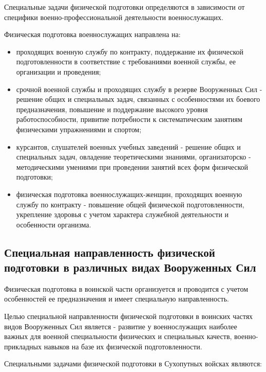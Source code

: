 \documentclass[a4paper]{article}
\begin{document}
    Специальные задачи физической подготовки определяются в зависимости от специфики военно-профессиональной деятельности военнослужащих.

    Физическая подготовка военнослужащих направлена на:

    \begin{itemize}
        \item проходящих военную службу по контракту, поддержание их физической подготовленности в соответствие с требованиями военной службы, ее организации и проведения;
        \item срочной военной службы и проходящих службу в резерве Вооруженных Сил - решение общих и специальных задач, связанных с особенностями их боевого предназначения, повышение и поддержание высокого уровня работоспособности, привитие потребности к систематическим занятиям физическими упражнениями и спортом;
        \item курсантов, слушателей военных учебных заведений - решение общих и специальных задач, овладение теоретическими знаниями, организаторско - методическими умениями при проведении занятий всех форм физической подготовки;
        \item физическая подготовка военнослужащих-женщин, проходящих военную службу по контракту - повышение общей физической подготовленности, укрепление здоровья с учетом характера служебной деятельности и особенности организма.
    \end{itemize}

    \subsection{Специальная направленность физической подготовки в различных видах Вооруженных Сил}

    Физическая подготовка в воинской части организуется и проводится с учетом особенностей ее предназначения и имеет специальную направленность.

    Целью специальной направленности физической подготовки в воинских частях видов Вооруженных Сил является - развитие у военнослужащих наиболее важных для военной специальности физических и специальных качеств, военно-прикладных навыков на базе их физической подготовленности.

    Специальными задачами физической подготовки в Сухопутных войсках являются:
\end{document}
